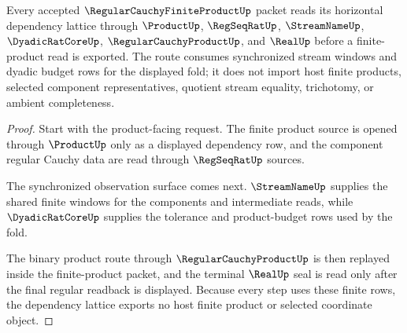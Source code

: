 \begin{theorem}
\label{thm:regular-cauchy-finite-product-lattice-route}
Every accepted $\RegularCauchyFiniteProductUp$ packet reads its horizontal dependency lattice through $\ProductUp$, $\RegSeqRatUp$, $\StreamNameUp$, $\DyadicRatCoreUp$, $\RegularCauchyProductUp$, and $\RealUp$ before a finite-product read is exported. The route consumes synchronized stream windows and dyadic budget rows for the displayed fold; it does not import host finite products, selected component representatives, quotient stream equality, trichotomy, or ambient completeness.
\end{theorem}
\begin{proof}
Start with the product-facing request. The finite product source is opened through $\ProductUp$ only as a displayed dependency row, and the component regular Cauchy data are read through $\RegSeqRatUp$ sources.

The synchronized observation surface comes next. $\StreamNameUp$ supplies the shared finite windows for the components and intermediate reads, while $\DyadicRatCoreUp$ supplies the tolerance and product-budget rows used by the fold.

The binary product route through $\RegularCauchyProductUp$ is then replayed inside the finite-product packet, and the terminal $\RealUp$ seal is read only after the final regular readback is displayed. Because every step uses these finite rows, the dependency lattice exports no host finite product or selected coordinate object.
\end{proof}
